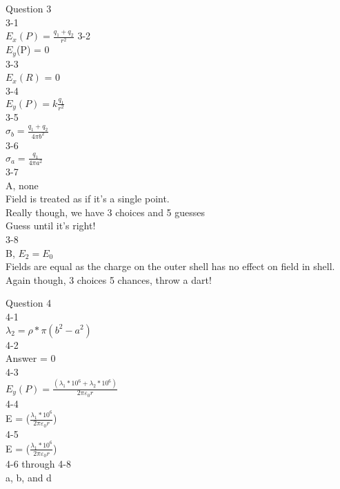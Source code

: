 \documentclass{article}
\begin{document}
\vspace{2mm}

\noindent
Question 3 \\
3-1 \\
$E_x(P) = \frac{q_1 + q_2}{r^2}$
3-2 \\
$E_y$(P) = 0 \\
3-3 \\
$E_x(R)$ = 0 \\
3-4 \\
$E_y(P) = k\frac{q_1}{r^2}$ \\
3-5 \\
$\sigma_b = \frac{q_1 + q_2}{4 \pi b^2}$ \\
3-6 \\
$\sigma_a = \frac{q_1}{4 \pi a^2}$ \\
3-7 \\
A, none\\
Field is treated as if it's a single point. \\
Really though, we have 3 choices and 5 guesses \\
Guess until it's right! \\
3-8 \\
B, $E_2 = E_0$ \\
Fields are equal as the charge on the outer shell has no effect on field in shell. \\
Again though, 3 choices 5 chances, throw a dart!

\vspace{2mm}

\noindent
Question 4 \\
4-1 \\
$\lambda_2 = \rho * \pi (b^2 - a^2)$ \\
4-2 \\
Answer = 0 \\
4-3 \\
$E_y(P) = \frac{(\lambda_1*10^6 + \lambda_2*10^6)}{2 \pi \varepsilon_0 r}$ \\
4-4 \\
E = ($\frac{\lambda_1*10^6}{2 \pi \varepsilon_0 r}$) \\
4-5 \\
E = ($\frac{\lambda_1*10^6}{2 \pi \varepsilon_0 r}$) \\
4-6 through 4-8 \\
a, b, and d

\vspace{2mm}
\end{document}
